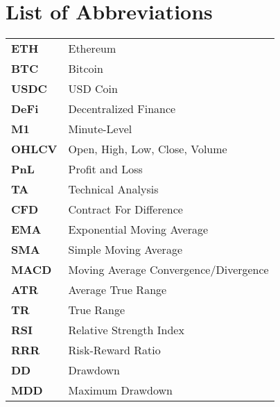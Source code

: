 \section*{List of Abbreviations}

\begin{tabularx}{\textwidth}{@{}lL{0.8\textwidth}@{}}
    \textbf{ETH}  & Ethereum                              \\
    \textbf{BTC}  & Bitcoin                               \\
    \textbf{USDC} & USD Coin                              \\
    \textbf{DeFi}   & Decentralized Finance                 \\
    \textbf{M1}   & Minute-Level                          \\
    \textbf{OHLCV}  & Open, High, Low, Close, Volume        \\


    \textbf{PnL}  & Profit and Loss                       \\
    \textbf{TA}   & Technical Analysis                    \\
    \textbf{CFD}  & Contract For Difference               \\
    \textbf{EMA}  & Exponential Moving Average            \\
    \textbf{SMA}  & Simple Moving Average                 \\
    \textbf{MACD} & Moving Average Convergence/Divergence \\
    \textbf{ATR}  & Average True Range                    \\
    \textbf{TR}   & True Range                            \\
    \textbf{RSI}  & Relative Strength Index               \\
    \textbf{RRR}  & Risk-Reward Ratio                     \\
    \textbf{DD}   & Drawdown                              \\
    \textbf{MDD}  & Maximum Drawdown                      \\


\end{tabularx}
